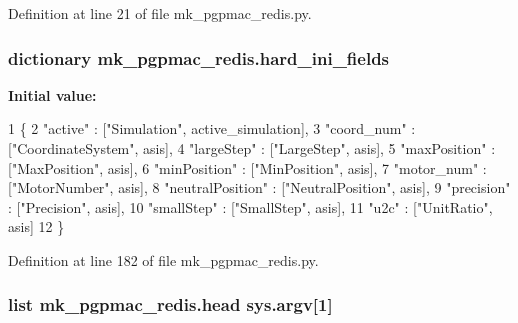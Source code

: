Definition at line 21 of file mk\-\_\-pgpmac\-\_\-redis.\-py.

\hypertarget{namespacemk__pgpmac__redis_a8257226983aee079ec66f5cc67e194ec}{
\subsubsection[{hard\-\_\-ini\-\_\-fields}]{\setlength{\rightskip}{0pt plus 5cm}dictionary mk\-\_\-pgpmac\-\_\-redis.\-hard\-\_\-ini\-\_\-fields}}\label{namespacemk__pgpmac__redis_a8257226983aee079ec66f5cc67e194ec}
{\bfseries Initial value\-:}
\begin{DoxyCode}
1 \{
2     \textcolor{stringliteral}{"active"}          : [\textcolor{stringliteral}{"Simulation"}, active\_simulation],
3     \textcolor{stringliteral}{"coord\_num"}       : [\textcolor{stringliteral}{"CoordinateSystem"}, asis],
4     \textcolor{stringliteral}{"largeStep"}       : [\textcolor{stringliteral}{"LargeStep"}, asis],
5     \textcolor{stringliteral}{"maxPosition"}     : [\textcolor{stringliteral}{"MaxPosition"}, asis],
6     \textcolor{stringliteral}{"minPosition"}     : [\textcolor{stringliteral}{"MinPosition"}, asis],
7     \textcolor{stringliteral}{"motor\_num"}       : [\textcolor{stringliteral}{"MotorNumber"}, asis],
8     \textcolor{stringliteral}{"neutralPosition"} : [\textcolor{stringliteral}{"NeutralPosition"}, asis],
9     \textcolor{stringliteral}{"precision"}       : [\textcolor{stringliteral}{"Precision"}, asis],
10     \textcolor{stringliteral}{"smallStep"}       : [\textcolor{stringliteral}{"SmallStep"}, asis],
11     \textcolor{stringliteral}{"u2c"}             : [\textcolor{stringliteral}{"UnitRatio"}, asis]
12     \}
\end{DoxyCode}


Definition at line 182 of file mk\-\_\-pgpmac\-\_\-redis.\-py.

\hypertarget{namespacemk__pgpmac__redis_a760ff4955cbf5beef4ae36a28c30b01a}{
\subsubsection[{head}]{\setlength{\rightskip}{0pt plus 5cm}list mk\-\_\-pgpmac\-\_\-redis.\-head sys.\-argv\mbox{[}1\mbox{]}}}\label{namespacemk__pgpmac__redis_a760ff4955cbf5beef4ae36a28c30b01a}


